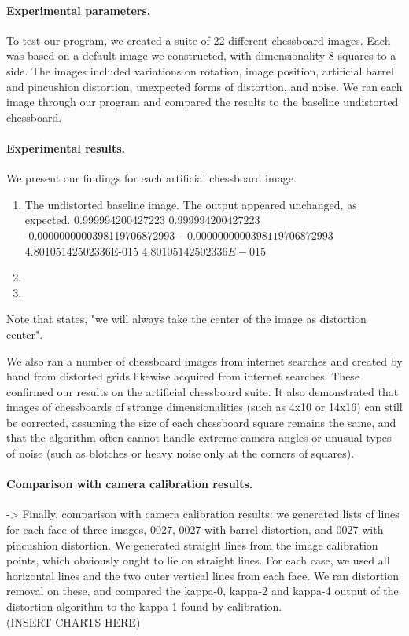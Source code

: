 \paragraph{Experimental parameters.}
To test our program, we created a suite of 22 different chessboard images. Each was based on a default image we constructed, with dimensionality 8 squares to a side. The images included variations on rotation, image position, artificial barrel and pincushion distortion, unexpected forms of distortion, and noise. We ran each image through our program and compared the results to the baseline undistorted chessboard.

\paragraph{Experimental results.}
We present our findings for each artificial chessboard image.
\begin{enumerate}
  \item The undistorted baseline image. The output appeared unchanged, as expected. 
0.999994200427223
$0.999994200427223$
-0.0000000000398119706872993
$-0.0000000000398119706872993$
4.80105142502336E-015
$4.80105142502336E-015$

  \item 
  \item 
\end{enumerate}

Note that \cite{algebraic-distortion} states, "we will always take the center of the image as distortion center".




We also ran a number of chessboard images from internet searches and created by hand from distorted grids likewise acquired from internet searches. These confirmed our results on the artificial chessboard suite. It also demonstrated that images of chessboards of strange dimensionalities (such as 4x10 or 14x16) can still be corrected, assuming the size of each chessboard square remains the same, and that the algorithm often cannot handle extreme camera angles or unusual types of noise (such as blotches or heavy noise only at the corners of squares).

\paragraph{Comparison with camera calibration results.}

-> Finally, comparison with camera calibration results: we generated lists of lines for each face of three images, 0027, 0027 with barrel distortion, and 0027 with pincushion distortion. We generated straight lines from the image calibration points, which obviously ought to lie on straight lines. For each case, we used all horizontal lines and the two outer vertical lines from each face. We ran distortion removal on these, and compared the kappa-0, kappa-2 and kappa-4 output of the distortion algorithm to the kappa-1 found by calibration.\\

(INSERT CHARTS HERE)





